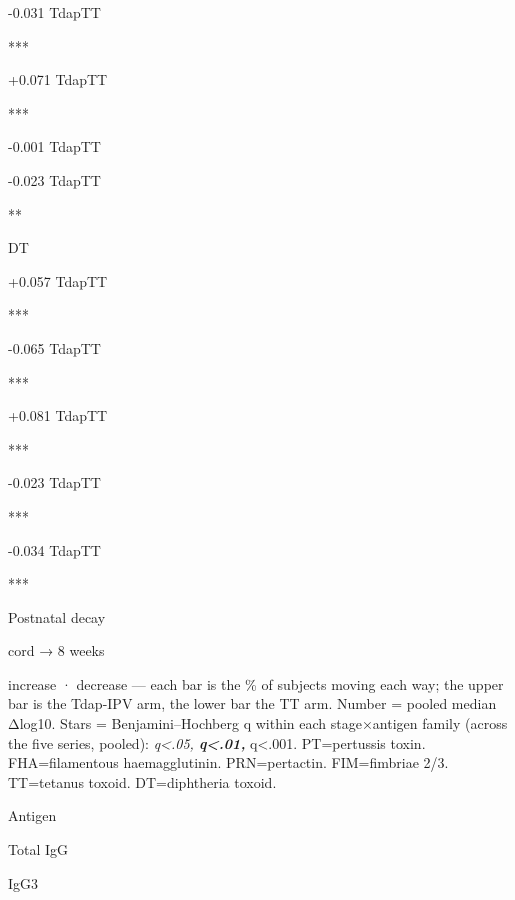 \documentclass[
]{article}
\begin{document}
{-0.031} {{Tdap}{TT}}

{}{}

{}{}

***

{+0.071} {{Tdap}{TT}}

{}{}

{}{}

***

{-0.001} {{Tdap}{TT}}

{}{}

{}{}

{}

{-0.023} {{Tdap}{TT}}

{}{}

{}{}

**

DT

{+0.057} {{Tdap}{TT}}

{}{}

{}{}

***

{-0.065} {{Tdap}{TT}}

{}{}

{}{}

***

{+0.081} {{Tdap}{TT}}

{}{}

{}{}

***

{-0.023} {{Tdap}{TT}}

{}{}

{}{}

***

{-0.034} {{Tdap}{TT}}

{}{}

{}{}

***

Postnatal decay

{cord → 8 weeks}

{{}increase · {}decrease --- each bar is the \% of subjects moving each
way; the upper bar is the Tdap-IPV arm, the lower bar the TT arm. Number
= pooled median Δlog10. Stars = Benjamini--Hochberg q within each
stage×antigen family (across the five series, pooled): \emph{
q\textless.05, \textbf{ q\textless.01, }} q\textless.001. PT=pertussis
toxin. FHA=filamentous haemagglutinin. PRN=pertactin. FIM=fimbriae 2/3.
TT=tetanus toxoid. DT=diphtheria toxoid.}

Antigen

Total IgG

IgG3
\end{document}
